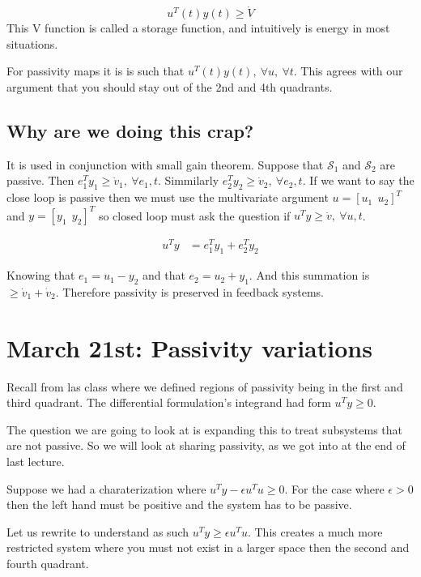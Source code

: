 \documentclass[11pt]{article}
\begin{document}
\begin{equation}
 	u^T(t)y(t) \geq \dot{V}
\end{equation}
This V function is called a storage function, and intuitively is energy in most situations.

For passivity maps it is is such that $u^T(t)y(t), \ \forall u, \ \forall t$. This agrees with our argument that you should stay out of the 2nd and 4th quadrants.


\subsection*{Why are we doing this crap?} %
\label{sub:why_are_we_doing_this_crap_}
It is used in conjunction with small gain theorem. Suppose that $\mathcal{S}_1$ and $\mathcal{S}_2$ are passive. Then $e_1^Ty_1 \geq \dot{v}_1,\ \forall e_1,t$. Simmilarly $e_2^Ty_2 \geq \dot{v}_2,\ \forall e_2,t$. If we want to say the close loop is passive then we must use the multivariate argument $u = [u_1 \ \ u_2]^T$ and $y = [y_1 \ \ y_2]^T$ so closed loop must ask the question if $u^Ty \geq \dot{v}, \ \forall u,t$.

\begin{align}
	u^Ty &= e_1^Ty_1 + e_2^Ty_2
\end{align}

Knowing that $e_1 = u_1 - y_2$ and that $e_2 = u_2 + y_1$. And this summation is $\geq \dot{v}_1 + \dot{v}_2$. Therefore passivity is preserved in feedback systems.







\section*{March 21st: Passivity variations}
Recall from las class where we defined regions of passivity being in the first and third quadrant. The differential formulation's integrand had form $u^Ty \geq 0$.

The question we are going to look at is expanding this to treat subsystems that are not passive. So we will look at sharing passivity, as we got into at the end of last lecture.

Suppose we had a charaterization where $u^Ty - \epsilon u^Tu \geq 0$. For the case where $\epsilon >0$ then the left hand must be positive and the system has to be passive.

Let us rewrite to understand as such $u^Ty \geq \epsilon u^Tu$. This creates a much more restricted system where you must not exist in a larger space then the second and fourth quadrant.
\end{document}
